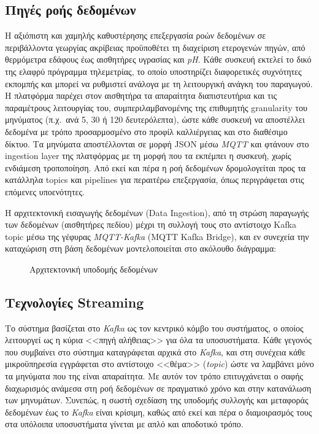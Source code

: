 \subsection{Πηγές ροής δεδομένων}

Η αξιόπιστη και χαμηλής καθυστέρησης επεξεργασία ροών δεδομένων σε περιβάλλοντα
γεωργίας ακρίβειας προϋποθέτει τη διαχείριση ετερογενών πηγών, από θερμόμετρα
εδάφους έως αισθητήρες υγρασίας και \textit{pH}. Κάθε συσκευή εκτελεί το δικό
της ελαφρύ πρόγραμμα τηλεμετρίας, το οποίο υποστηρίζει διαφορετικές συχνότητες
εκπομπής και μπορεί να ρυθμιστεί ανάλογα με τη λειτουργική ανάγκη του
παραγωγού. Η πλατφόρμα παρέχει στον αισθητήρα τα απαραίτητα διαπιστευτήρια και
τις παραμέτρους λειτουργίας του, συμπεριλαμβανομένης της επιθυμητής granularity
του μηνύματος (π.χ.\ ανά 5, 30 ή 120 δευτερόλεπτα), ώστε κάθε συσκευή να
αποστέλλει δεδομένα με τρόπο προσαρμοσμένο στο προφίλ καλλιέργειας και στο
διαθέσιμο δίκτυο. Τα μηνύματα αποστέλλονται σε μορφή JSON μέσω \textit{MQTT}
και φτάνουν στο ingestion layer της πλατφόρμας με τη μορφή που τα εκπέμπει η
συσκευή, χωρίς ενδιάμεση τροποποίηση. Από εκεί και πέρα η ροή δεδομένων
δρομολογείται προς τα κατάλληλα topics και pipelines για περαιτέρω επεξεργασία,
όπως περιγράφεται στις επόμενες υποενότητες.

Η αρχιτεκτονική εισαγωγής δεδομένων (Data Ingestion), από τη στρώση παραγωγής
των δεδομένων (αισθητήρες πεδίου) μέχρι τη συλλογή τους στο αντίστοιχο Kafka
topic μέσω της γέφυρας \textit{MQTT-Kafka} (MQTT Kafka Bridge), και εν
συνεχεία την καταχώριση στη βάση δεδομένων μοντελοποιείται στο ακόλουθο
διάγραμμα:

\begin{figure}[H]
	\centering
	\makebox[\textwidth]{%
	}
	\caption{Αρχιτεκτονική υποδομής δεδομένων}
	\label{fig:data-stack}
\end{figure}

\subsection{Τεχνολογίες Streaming}

Το σύστημα βασίζεται στο \textit{Kafka} ως τον κεντρικό κόμβο του συστήματος, ο
οποίος λειτουργεί ως η κύρια <<πηγή αλήθειας>> για όλα τα υποσυστήματα. Κάθε
γεγονός που συμβαίνει στο σύστημα καταγράφεται αρχικά στο \textit{Kafka}, και
στη συνέχεια κάθε μικροϋπηρεσία εγγράφεται στο αντίστοιχο <<θέμα>>
(\textit{topic}) ώστε να λαμβάνει μόνο τα μηνύματα που της είναι απαραίτητα. Με
αυτόν τον τρόπο επιτυγχάνεται ο σαφής διαχωρισμός ανάμεσα στη ροή δεδομένων σε
πραγματικό χρόνο και στην κατανάλωση των μηνυμάτων. Συνεπώς, η σωστή σχεδίαση
της υποδομής συλλογής και μεταφοράς δεδομένων έως το \textit{Kafka} είναι
κρίσιμη, καθώς από εκεί και πέρα ο διαμοιρασμός τους στα υπόλοιπα υποσυστήματα
γίνεται με απλό και αποδοτικό τρόπο.

